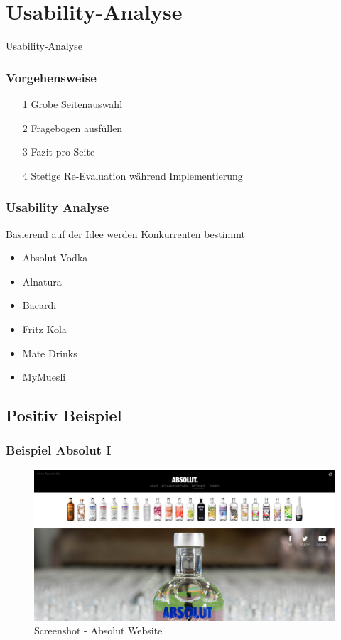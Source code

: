 \section{Usability-Analyse}

\begin{frame}
	\begin{center}
		\huge{Usability-Analyse}
	\end{center}
\end{frame}

\begin{frame}
	\frametitle{Vorgehensweise}
	\begin{itemize}
		\item[1] Grobe Seitenauswahl 
		\item[2] Fragebogen ausfüllen
		\item[3] Fazit pro Seite
		\item[4] Stetige Re-Evaluation während Implementierung
	\end{itemize}
\end{frame}

\begin{frame}
	\frametitle{Usability Analyse}
	Basierend auf der Idee werden Konkurrenten bestimmt
	\begin{itemize}
		\item Absolut Vodka
		\item Alnatura
		\item Bacardi
		\item Fritz Kola
		\item Mate Drinks
		\item MyMuesli
	\end{itemize}
\end{frame}


\subsection{Positiv Beispiel}
\begin{frame}
	\frametitle{Beispiel Absolut I}
	\begin{figure}
	\includegraphics[scale=0.2]{bilder/absolut.png}
	\caption[Screenshot - Absolut Vodka]{Screenshot - Absolut Website}
	\label{labelname}
	\end{figure}
\end{frame}

